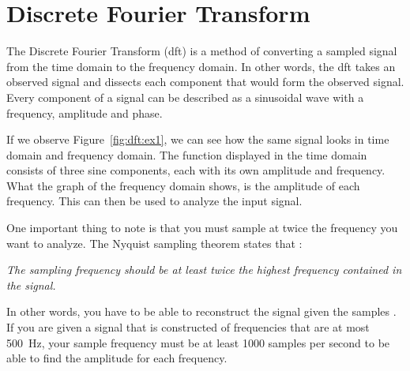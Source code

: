 \section{Discrete Fourier Transform}\label{ch:dft}
The Discrete Fourier Transform (\gls{dft}) is a method of converting a sampled signal from the time domain to the frequency domain. In other words, the \gls{dft} takes an observed signal and dissects each component that would form the observed signal. Every component of a signal can be described as a sinusoidal wave with a frequency, amplitude and phase.

If we observe Figure~\ref{fig:dft:ex1}, we can see how the same signal looks in time domain and frequency domain. The function displayed in the time domain consists of three sine components, each with its own amplitude and frequency. What the graph of the frequency domain shows, is the amplitude of each frequency. This can then be used to analyze the input signal.

One important thing to note is that you must sample at twice the frequency you want to analyze. The Nyquist sampling theorem states that \cite{signal:aliasing}:
\begin{center}
    \textit{The sampling frequency should be at least twice the highest frequency contained in the signal.}
\end{center}
In other words, you have to be able to reconstruct the signal given the samples \cite[Ch~3]{smith1997scientist}. If you are given a signal that is constructed of frequencies that are at most 500~Hz, your sample frequency must be at least 1000 samples per second to be able to find the amplitude for each frequency.

